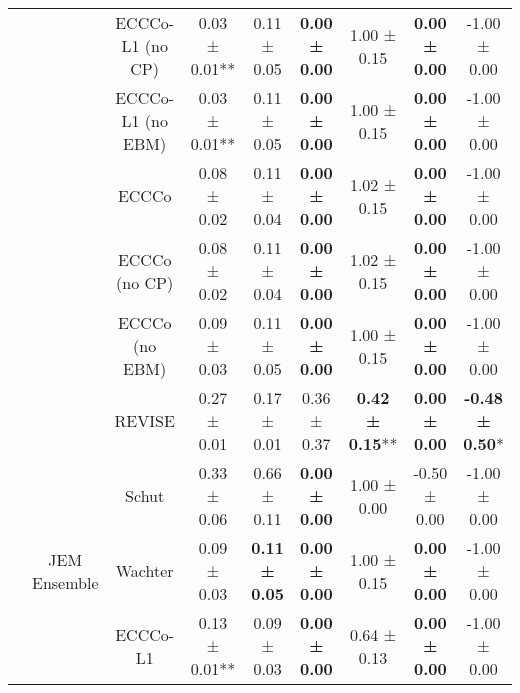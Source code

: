 \begin{longtable}[t]{ccccccccc}
 &  & ECCCo-L1 (no CP) & 0.03 ± 0.01** & 0.11 ± 0.05\hphantom{*}\hphantom{*} & \textbf{0.00 ± 0.00}\hphantom{*}\hphantom{*} & 1.00 ± 0.15\hphantom{*}\hphantom{*} & \textbf{0.00 ± 0.00}\hphantom{*}\hphantom{*} & -1.00 ± 0.00\hphantom{*}\hphantom{*}\\

 &  & ECCCo-L1 (no EBM) & 0.03 ± 0.01** & 0.11 ± 0.05\hphantom{*}\hphantom{*} & \textbf{0.00 ± 0.00}\hphantom{*}\hphantom{*} & 1.00 ± 0.15\hphantom{*}\hphantom{*} & \textbf{0.00 ± 0.00}\hphantom{*}\hphantom{*} & -1.00 ± 0.00\hphantom{*}\hphantom{*}\\

 &  & ECCCo & 0.08 ± 0.02\hphantom{*}\hphantom{*} & 0.11 ± 0.04\hphantom{*}\hphantom{*} & \textbf{0.00 ± 0.00}\hphantom{*}\hphantom{*} & 1.02 ± 0.15\hphantom{*}\hphantom{*} & \textbf{0.00 ± 0.00}\hphantom{*}\hphantom{*} & -1.00 ± 0.00\hphantom{*}\hphantom{*}\\

 &  & ECCCo (no CP) & 0.08 ± 0.02\hphantom{*}\hphantom{*} & 0.11 ± 0.04\hphantom{*}\hphantom{*} & \textbf{0.00 ± 0.00}\hphantom{*}\hphantom{*} & 1.02 ± 0.15\hphantom{*}\hphantom{*} & \textbf{0.00 ± 0.00}\hphantom{*}\hphantom{*} & -1.00 ± 0.00\hphantom{*}\hphantom{*}\\

 &  & ECCCo (no EBM) & 0.09 ± 0.03\hphantom{*}\hphantom{*} & 0.11 ± 0.05\hphantom{*}\hphantom{*} & \textbf{0.00 ± 0.00}\hphantom{*}\hphantom{*} & 1.00 ± 0.15\hphantom{*}\hphantom{*} & \textbf{0.00 ± 0.00}\hphantom{*}\hphantom{*} & -1.00 ± 0.00\hphantom{*}\hphantom{*}\\

 &  & REVISE & 0.27 ± 0.01\hphantom{*}\hphantom{*} & 0.17 ± 0.01\hphantom{*}\hphantom{*} & 0.36 ± 0.37\hphantom{*}\hphantom{*} & \textbf{0.42 ± 0.15}** & \textbf{0.00 ± 0.00}\hphantom{*}\hphantom{*} & \textbf{-0.48 ± 0.50}*\hphantom{*}\\

 &  & Schut & 0.33 ± 0.06\hphantom{*}\hphantom{*} & 0.66 ± 0.11\hphantom{*}\hphantom{*} & \textbf{0.00 ± 0.00}\hphantom{*}\hphantom{*} & 1.00 ± 0.00\hphantom{*}\hphantom{*} & -0.50 ± 0.00\hphantom{*}\hphantom{*} & -1.00 ± 0.00\hphantom{*}\hphantom{*}\\

 & \multirow[t]{-9}{*}{\centering\arraybackslash JEM Ensemble} & Wachter & 0.09 ± 0.03\hphantom{*}\hphantom{*} & \textbf{0.11 ± 0.05}\hphantom{*}\hphantom{*} & \textbf{0.00 ± 0.00}\hphantom{*}\hphantom{*} & 1.00 ± 0.15\hphantom{*}\hphantom{*} & \textbf{0.00 ± 0.00}\hphantom{*}\hphantom{*} & -1.00 ± 0.00\hphantom{*}\hphantom{*}\\
\cmidrule{2-9}
 &  & ECCCo-L1 & 0.13 ± 0.01** & 0.09 ± 0.03\hphantom{*}\hphantom{*} & \textbf{0.00 ± 0.00}\hphantom{*}\hphantom{*} & 0.64 ± 0.13\hphantom{*}\hphantom{*} & \textbf{0.00 ± 0.00}\hphantom{*}\hphantom{*} & -1.00 ± 0.00\hphantom{*}\hphantom{*}\\


\end{longtable}
